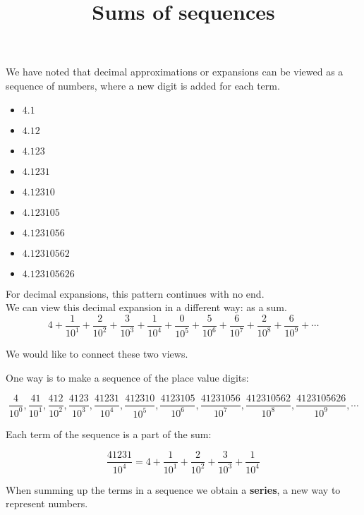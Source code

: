 \documentclass{ximera}
\title{Sums of sequences}
\begin{document}
\begin{abstract}
\end{abstract}

\maketitle




We have noted that decimal approximations or expansions can be viewed as a sequence of numbers, where a new digit is added for each term.


\begin{itemize}
\item $4.1$
\item $4.12$
\item $4.123$
\item $4.1231$
\item $4.12310$
\item $4.123105$
\item $4.1231056$
\item $4.12310562$
\item $4.123105626$
\end{itemize}


For decimal expansions, this pattern continues with no end. \\

We can view this decimal expansion in a different way: as a sum. \\


\[
4 + \frac{1}{10^1} + \frac{2}{10^2} + \frac{3}{10^3} + \frac{1}{10^4} + \frac{0}{10^5} + \frac{5}{10^6} + \frac{6}{10^7} + \frac{2}{10^8} + \frac{6}{10^9} + \cdots
\]



We would like to connect these two views.


One way is to make a sequence of the place value digits:  

\[
\frac{4}{10^0}, \frac{41}{10^1},  \frac{412}{10^2}, \frac{4123}{10^3}, \frac{41231}{10^4}, \frac{412310}{10^5}, \frac{4123105}{10^6}, \frac{41231056}{10^7}, \frac{412310562}{10^8}, \frac{4123105626}{10^9}, \cdots
\]


Each term of the sequence is a part of the sum:



\[
\frac{41231}{10^4} = 4 + \frac{1}{10^1} + \frac{2}{10^2} + \frac{3}{10^3} + \frac{1}{10^4} 
\]



When summing up the terms in a sequence we obtain a \textbf{series}, a new way to represent numbers. \\
\end{document}
